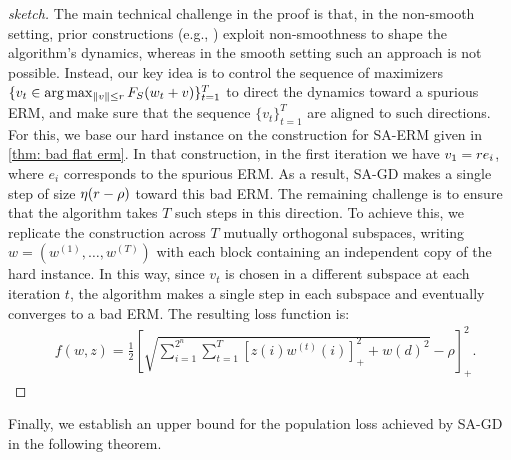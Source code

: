 \begin{proof}[sketch]


The main technical challenge in the proof is that, in the non-smooth setting, prior constructions (e.g., \cite{amir2021sgd, koren2022benign, livni2024sample, schliserman2024dimension, vansover2025rapid}) exploit non-smoothness to shape the algorithm’s dynamics, whereas in the smooth setting such an approach is not possible. Instead, our key idea is to control the sequence of maximizers $\{v_t \in \arg\max_{\|v\| \leq r} F_S(w_t + v)\}_{t=1}^T$ to direct the dynamics toward a spurious ERM, and make sure that the sequence $\{v_t\}_{t=1}^T$ are aligned to such directions.
For this, we base our hard instance on the construction for SA-ERM given in \cref{thm: bad flat erm}. 
In that construction, in the first iteration we have $v_1 = r e_i$, where $e_i$ corresponds to the spurious ERM.
As a result, SA-GD makes a single step of size $\eta (r-\rho)$ toward this bad ERM. 
The remaining challenge is to ensure that the algorithm takes $T$ such steps in this direction. 
To achieve this, we replicate the construction across \(T\) mutually orthogonal subspaces, writing \(w=(w^{(1)},\dots,w^{(T)})\) with each block containing an independent copy of the hard instance. 
In this way, since $v_t$ is chosen in a different subspace at each iteration $t$, the algorithm makes a single step in each subspace and eventually converges to a bad ERM. The resulting loss function is:
\begin{align*}
& f(w,z) = \frac{1}{2}\left[  
\sqrt{
\sum_{i=1}^{2^n}\sum_{t=1}^T
[z(i)w^{(t)}(i)]_+^2
+ w(d)^2
}
-\rho
\right]_+^2.
\end{align*}
\end{proof}
Finally, we establish an upper bound for the population loss achieved by SA-GD in the following theorem.  

